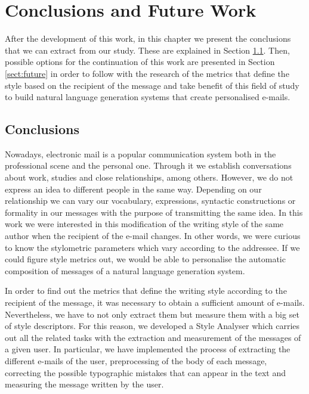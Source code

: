 \chapter{Conclusions and Future Work}
\label{cap:conclusiones}


After the development of this work, in this chapter we present the conclusions that we can extract from our study. These are explained in Section \ref{sect:conc}. Then, possible options for the continuation of this work are presented in Section \ref{sect:future} in order to follow with the research of the metrics that define the style based on the recipient of the message and take benefit of this field of study to build natural language generation systems that create personalised e-mails.

\section{Conclusions}\label{sect:conc}
Nowadays, electronic mail is a popular communication system both in the professional scene and the personal one. Through it we establish conversations about work, studies and close relationships, among others. However, we do not express an idea to different people in the same way. Depending on our relationship we can vary our vocabulary, expressions, syntactic constructions or formality in our messages with the purpose of transmitting the same idea. In this work we were interested in this modification of the writing style of the same author when the recipient of the e-mail changes. In other words, we were curious to know the stylometric parameters which vary according to the addressee. If we could figure  style metrics out, we would be able to personalise the automatic composition of messages of a natural language generation system.

In order to find out the metrics that define the writing style according to the recipient of the message, it was necessary to obtain a sufficient amount of e-mails. Nevertheless, we have to not only extract them but measure them with a big set of style descriptors. For this reason, we developed a Style Analyser which carries out all the related tasks with the extraction and measurement of the messages of a given user. In particular, we have implemented the process of extracting the different e-mails of the user, preprocessing of the body of each message, correcting the possible typographic mistakes that can appear in the text and measuring the message written by the user.

